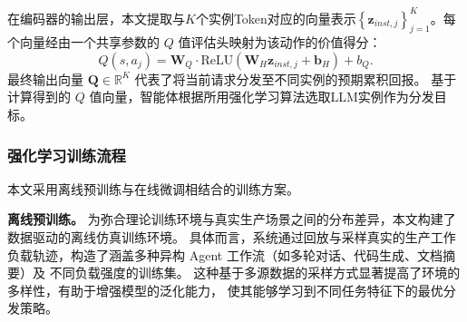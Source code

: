 在编码器的输出层，本文提取与$K$个实例Token对应的向量表示$\left\{\mathbf{z}_{inst,j}\right\}_{j=1}^K$。每个向量经由一个共享参数的 $Q$ 值评估头映射为该动作的价值得分：
\begin{equation}
  Q\left(s, a_j\right) = \mathbf{W}_Q \cdot \text{ReLU}\left(\mathbf{W}_H \mathbf{z}_{inst,j} + \mathbf{b}_H\right) + b_Q.
\end{equation}
最终输出向量 $\mathbf{Q} \in \mathbb{R}^K$ 代表了将当前请求分发至不同实例的预期累积回报。
基于计算得到的 $Q$ 值向量，智能体根据所用强化学习算法选取LLM实例作为分发目标。


\subsubsection{强化学习训练流程}\label{sec:training}

本文采用离线预训练与在线微调相结合的训练方案。





\textbf{离线预训练。}
为弥合理论训练环境与真实生产场景之间的分布差异，本文构建了数据驱动的离线仿真训练环境。
具体而言，系统通过回放与采样真实的生产工作负载轨迹，构造了涵盖多种异构 Agent 工作流（如多轮对话、代码生成、文档摘要）及
不同负载强度的训练集。
这种基于多源数据的采样方式显著提高了环境的多样性，有助于增强模型的泛化能力，
使其能够学习到不同任务特征下的最优分发策略。

